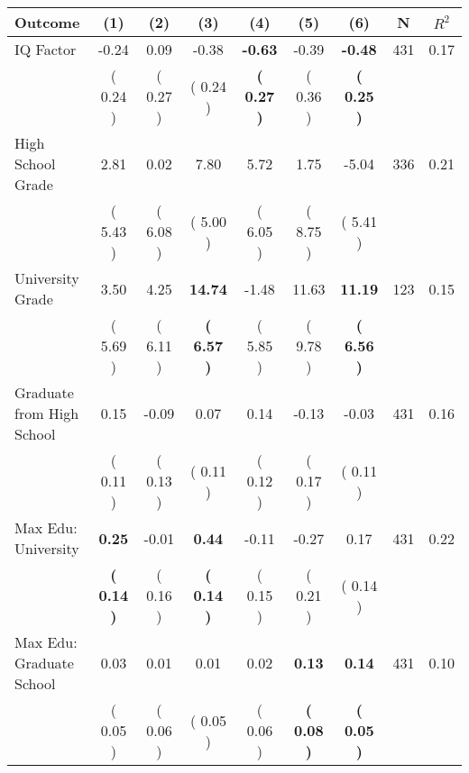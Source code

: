 \begin{tabular}{lcccccccc}
\toprule
 \textbf{Outcome} & \textbf{(1)} & \textbf{(2)} & \textbf{(3)} & \textbf{(4)} & \textbf{(5)} & \textbf{(6)} & \textbf{N} & \textbf{$ R^2$} \\
\midrule
IQ Factor &     -0.24 &      0.09 &     -0.38 & \textbf{    -0.63} &     -0.39 & \textbf{    -0.48} & 431 &       0.17 \\ 
 & (     0.24 ) & (     0.27 ) & (     0.24 ) & \textbf{(     0.27 )} & (     0.36 ) & \textbf{(     0.25 )} & \\
High School Grade &      2.81 &      0.02 &      7.80 &      5.72 &      1.75 &     -5.04 & 336 &       0.21 \\ 
 & (     5.43 ) & (     6.08 ) & (     5.00 ) & (     6.05 ) & (     8.75 ) & (     5.41 ) & \\
University Grade &      3.50 &      4.25 & \textbf{    14.74} &     -1.48 &     11.63 & \textbf{    11.19} & 123 &       0.15 \\ 
 & (     5.69 ) & (     6.11 ) & \textbf{(     6.57 )} & (     5.85 ) & (     9.78 ) & \textbf{(     6.56 )} & \\
Graduate from High School &      0.15 &     -0.09 &      0.07 &      0.14 &     -0.13 &     -0.03 & 431 &       0.16 \\ 
 & (     0.11 ) & (     0.13 ) & (     0.11 ) & (     0.12 ) & (     0.17 ) & (     0.11 ) & \\
Max Edu: University & \textbf{     0.25} &     -0.01 & \textbf{     0.44} &     -0.11 &     -0.27 &      0.17 & 431 &       0.22 \\ 
 & \textbf{(     0.14 )} & (     0.16 ) & \textbf{(     0.14 )} & (     0.15 ) & (     0.21 ) & (     0.14 ) & \\
Max Edu: Graduate School &      0.03 &      0.01 &      0.01 &      0.02 & \textbf{     0.13} & \textbf{     0.14} & 431 &       0.10 \\ 
 & (     0.05 ) & (     0.06 ) & (     0.05 ) & (     0.06 ) & \textbf{(     0.08 )} & \textbf{(     0.05 )} & \\
\bottomrule
\end{tabular}
